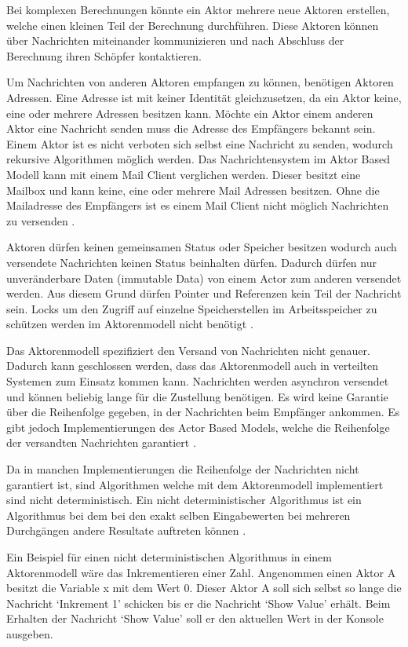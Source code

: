 Bei komplexen Berechnungen könnte ein Aktor mehrere neue Aktoren erstellen, welche einen kleinen Teil der Berechnung durchführen. Diese Aktoren können über Nachrichten miteinander kommunizieren und nach Abschluss der Berechnung ihren Schöpfer kontaktieren. 

Um Nachrichten von anderen Aktoren empfangen zu können, benötigen Aktoren Adressen. Eine Adresse ist mit keiner Identität gleichzusetzen, da ein Aktor keine, eine oder mehrere Adressen besitzen kann. Möchte ein Aktor einem anderen Aktor eine Nachricht senden muss die Adresse des Empfängers bekannt sein. Einem Aktor ist es nicht verboten sich selbst eine Nachricht zu senden, wodurch rekursive Algorithmen möglich werden. Das Nachrichtensystem im Aktor Based Modell kann mit einem Mail Client verglichen werden. Dieser besitzt eine Mailbox und kann keine, eine oder mehrere Mail Adressen besitzen. Ohne die Mailadresse des Empfängers ist es einem Mail Client nicht möglich Nachrichten zu versenden \cite[p. 85]{Erb2012}. 

Aktoren dürfen keinen gemeinsamen Status oder Speicher besitzen wodurch auch versendete Nachrichten keinen Status beinhalten dürfen. Dadurch dürfen nur unveränderbare Daten (immutable Data) von einem Actor zum anderen versendet werden. Aus diesem Grund dürfen Pointer und Referenzen kein Teil der Nachricht sein. Locks um den Zugriff auf einzelne Speicherstellen im Arbeitsspeicher zu schützen werden im Aktorenmodell nicht benötigt \cite[p. 85]{Erb2012}.

Das Aktorenmodell spezifiziert den Versand von Nachrichten nicht genauer. Dadurch kann geschlossen werden, dass das Aktorenmodell auch in verteilten Systemen zum Einsatz kommen kann. Nachrichten werden asynchron versendet und können beliebig lange für die Zustellung benötigen. Es wird keine Garantie über die Reihenfolge gegeben, in der Nachrichten beim Empfänger ankommen. Es gibt jedoch Implementierungen des Actor Based Models, welche die Reihenfolge der versandten Nachrichten garantiert \cite[p. 85]{Erb2012}.

Da in manchen Implementierungen die Reihenfolge der Nachrichten nicht garantiert ist, sind Algorithmen welche mit dem Aktorenmodell implementiert sind nicht deterministisch. Ein nicht deterministischer Algorithmus ist ein Algorithmus bei dem bei den exakt selben Eingabewerten bei mehreren Durchgängen andere Resultate auftreten können \cite[]{Agh85}. 

Ein Beispiel für einen nicht deterministischen Algorithmus in einem Aktorenmodell wäre das Inkrementieren einer Zahl. Angenommen einen Aktor A besitzt die Variable x mit dem Wert 0. Dieser Aktor A soll sich selbst so lange die Nachricht `Inkrement 1' schicken bis er die Nachricht `Show Value' erhält. Beim Erhalten der Nachricht `Show Value' soll er den aktuellen Wert in der Konsole ausgeben.

